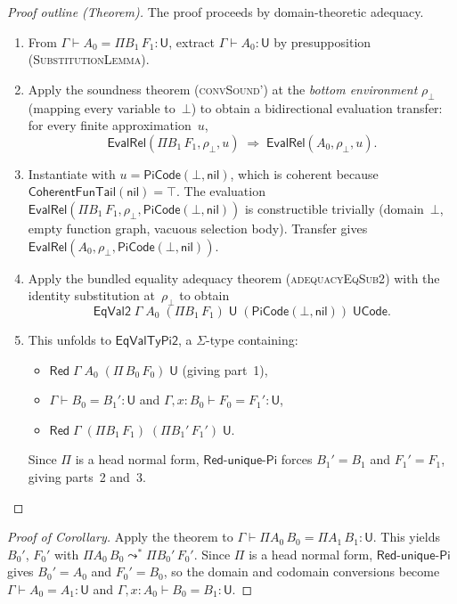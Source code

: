 \documentclass[11pt]{article}
\newcommand{\hastype}[3]{#1 \vdash #2 : #3}
\newcommand{\conveq}[4]{#1 \vdash #2 = #3 : #4}
\newcommand{\U}{\mathsf{U}}
\begin{document}
\begin{proof}[Proof outline (Theorem)]
  The proof proceeds by domain-theoretic adequacy.
  \begin{enumerate}
    \item From $\conveq{\Gamma}{A_0}{\Pi B_1\,F_1}{\U}$, extract
      $\hastype{\Gamma}{A_0}{\U}$ by presupposition
      (\textsc{SubstitutionLemma}).
    \item Apply the soundness theorem (\textsc{convSound'}) at the
      \emph{bottom environment} $\rho_\bot$ (mapping every variable to~$\bot$)
      to obtain a bidirectional evaluation transfer: for every finite
      approximation~$u$,
      \[
        \mathsf{EvalRel}(\Pi B_1\,F_1, \rho_\bot, u)
        \;\Longrightarrow\;
        \mathsf{EvalRel}(A_0, \rho_\bot, u).
      \]
    \item Instantiate with $u = \mathsf{PiCode}(\bot, \mathsf{nil})$,
      which is coherent because
      $\mathsf{CoherentFunTail}(\mathsf{nil}) = \top$.
      The evaluation $\mathsf{EvalRel}(\Pi B_1\,F_1, \rho_\bot,
      \mathsf{PiCode}(\bot,\mathsf{nil}))$ is constructible trivially
      (domain~$\bot$, empty function graph, vacuous selection body).
      Transfer gives $\mathsf{EvalRel}(A_0, \rho_\bot,
      \mathsf{PiCode}(\bot,\mathsf{nil}))$.
    \item Apply the bundled equality adequacy theorem
      (\textsc{adequacyEqSub2}) with the identity substitution
      at~$\rho_\bot$ to obtain
      \[
        \mathsf{EqVal2}\;\Gamma\;A_0\;(\Pi B_1\,F_1)\;\U\;
        (\mathsf{PiCode}(\bot,\mathsf{nil}))\;\mathsf{UCode}.
      \]
    \item This unfolds to $\mathsf{EqValTyPi2}$, a $\Sigma$-type
      containing:
      \begin{itemize}
        \item $\mathsf{Red}\;\Gamma\;A_0\;(\Pi\,B_0\,F_0)\;\U$
          \quad (giving part~1),
        \item $\conveq{\Gamma}{B_0}{B_1'}{\U}$ and
          $\conveq{\Gamma, x{:}B_0}{F_0}{F_1'}{\U}$,
        \item $\mathsf{Red}\;\Gamma\;(\Pi B_1\,F_1)\;(\Pi B_1'\,F_1')\;\U$.
      \end{itemize}
      Since $\Pi$ is a head normal form,
      $\mathsf{Red\text{-}unique\text{-}Pi}$ forces $B_1' = B_1$ and
      $F_1' = F_1$, giving parts~2 and~3.
  \end{enumerate}
\end{proof}

\begin{proof}[Proof of Corollary]
  Apply the theorem to
  $\conveq{\Gamma}{\Pi A_0\,B_0}{\Pi A_1\,B_1}{\U}$.
  This yields $B_0'$, $F_0'$ with
  $\Pi A_0\,B_0 \leadsto^* \Pi B_0'\,F_0'$.
  Since $\Pi$ is a head normal form, $\mathsf{Red\text{-}unique\text{-}Pi}$
  gives $B_0' = A_0$ and $F_0' = B_0$, so the domain and codomain
  conversions become
  $\conveq{\Gamma}{A_0}{A_1}{\U}$ and
  $\conveq{\Gamma, x{:}A_0}{B_0}{B_1}{\U}$.
\end{proof}
\end{document}
